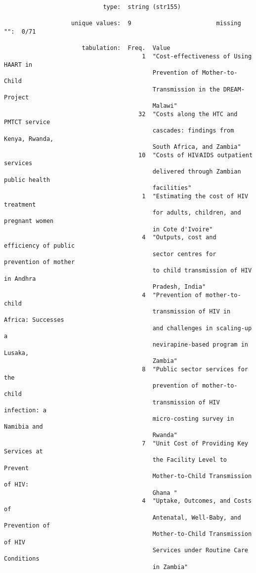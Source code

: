 \documentclass{article}
\begin{document}
\begin{verbatim}
                            type:  string (str155)
          
                   unique values:  9                        missing "":  0/71
          
                      tabulation:  Freq.  Value
                                       1  "Cost-effectiveness of Using HAART in
                                          Prevention of Mother-to-Child
                                          Transmission in the DREAM-Project
                                          Malawi"
                                      32  "Costs along the HTC and PMTCT service
                                          cascades: findings from Kenya, Rwanda,
                                          South Africa, and Zambia"
                                      10  "Costs of HIV⁄AIDS outpatient services
                                          delivered through Zambian public health
                                          facilities"
                                       1  "Estimating the cost of HIV treatment
                                          for adults, children, and pregnant women
                                          in Cote d'Ivoire"
                                       4  "Outputs, cost and efficiency of public
                                          sector centres for prevention of mother
                                          to child transmission of HIV in Andhra
                                          Pradesh, India"
                                       4  "Prevention of mother-to-child
                                          transmission of HIV in Africa: Successes
                                          and challenges in scaling-up a
                                          nevirapine-based program in Lusaka,
                                          Zambia"
                                       8  "Public sector services for the
                                          prevention of mother-to-child
                                          transmission of HIV infection: a
                                          micro-costing survey in Namibia and
                                          Rwanda"
                                       7  "Unit Cost of Providing Key Services at
                                          the Facility Level to Prevent
                                          Mother-to-Child Transmission of HIV:
                                          Ghana "
                                       4  "Uptake, Outcomes, and Costs of
                                          Antenatal, Well-Baby, and Prevention of
                                          Mother-to-Child Transmission of HIV
                                          Services under Routine Care Conditions
                                          in Zambia"
          

\end{verbatim}
\end{document}
